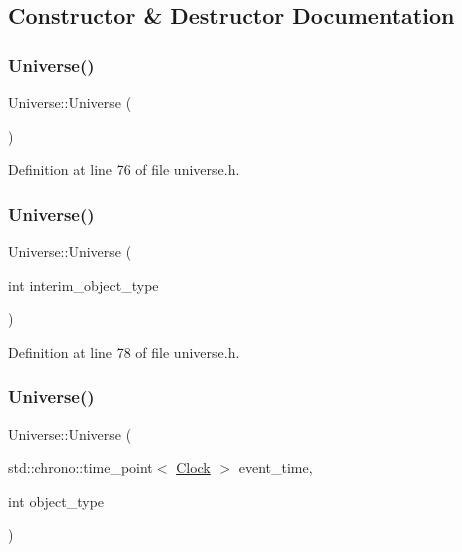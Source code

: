 \subsection{Constructor \& Destructor Documentation}
\mbox{\label{class_universe_a4d137a146dd3c2514dfb692dfbab6984}} 
\subsubsection{\texorpdfstring{Universe()}{Universe()}\hspace{0.1cm}{\footnotesize\ttfamily [1/3]}}
{\footnotesize\ttfamily Universe\+::\+Universe (\begin{DoxyParamCaption}{ }\end{DoxyParamCaption})\hspace{0.3cm}{\ttfamily [inline]}}



Definition at line 76 of file universe.\+h.

\mbox{\label{class_universe_a1210ce56049f1fc67f53aeda223bb82b}} 
\subsubsection{\texorpdfstring{Universe()}{Universe()}\hspace{0.1cm}{\footnotesize\ttfamily [2/3]}}
{\footnotesize\ttfamily Universe\+::\+Universe (\begin{DoxyParamCaption}\item[{int}]{interim\+\_\+object\+\_\+type }\end{DoxyParamCaption})\hspace{0.3cm}{\ttfamily [inline]}}



Definition at line 78 of file universe.\+h.

\mbox{\label{class_universe_a03af7455263d3028b55ca5dc93ebb6ba}} 
\subsubsection{\texorpdfstring{Universe()}{Universe()}\hspace{0.1cm}{\footnotesize\ttfamily [3/3]}}
{\footnotesize\ttfamily Universe\+::\+Universe (\begin{DoxyParamCaption}\item[{std\+::chrono\+::time\+\_\+point$<$ \hyperlink{universe_8h_a0ef8d951d1ca5ab3cfaf7ab4c7a6fd80}{Clock} $>$}]{event\+\_\+time,  }\item[{int}]{object\+\_\+type }\end{DoxyParamCaption})\hspace{0.3cm}{\ttfamily [inline]}}



